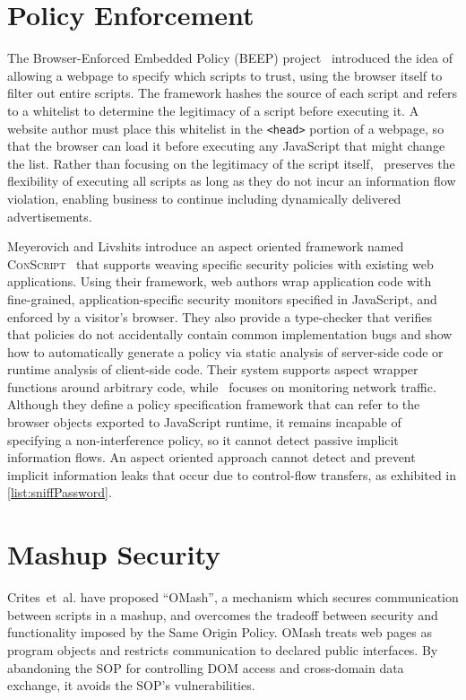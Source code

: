 \section{Policy Enforcement}

The Browser-Enforced Embedded Policy (BEEP) project~\cite{beep} introduced the idea of allowing a webpage to specify which scripts to trust, using the browser itself to filter out entire scripts.
The framework hashes the source of each script and refers to a whitelist to determine the legitimacy of a script before executing it.
A website author must place this whitelist in the \texttt{<head>} portion of a webpage, so that the browser can load it before executing any JavaScript that might change the list.
Rather than focusing on the legitimacy of the script itself, \FlowCore\ preserves the flexibility of executing all scripts as long as they do not incur an information flow violation, enabling business to continue including dynamically delivered advertisements.

Meyerovich and Livshits introduce an aspect oriented framework named \textsc{ConScript}~\cite{meyerovich.livshits+10} that supports weaving specific security policies with existing web applications.
Using their framework, web authors wrap application code with fine-grained, application-specific security monitors specified in JavaScript, and enforced by a visitor's browser.
They also provide a type-checker that verifies that policies do not accidentally contain common implementation bugs and show how to automatically generate a policy via static analysis of server-side code or runtime analysis of client-side code.
Their system supports aspect wrapper functions around arbitrary code, while \FlowCore\ focuses on monitoring network traffic.
Although they define a policy specification framework that can refer to the browser objects exported to JavaScript runtime, it remains incapable of specifying a non-interference policy, so it cannot detect passive implicit information flows.
An aspect oriented approach cannot detect and prevent implicit information leaks that occur due to control-flow transfers, as exhibited in \autoref{list:sniffPassword}.

\section{Mashup Security}

Crites~et~al.\cite{crites.etal+08} have proposed ``OMash'', a mechanism which secures communication between scripts in a mashup, and overcomes the tradeoff between security and functionality imposed by the Same Origin Policy.
OMash treats web pages as program objects and restricts communication to declared public interfaces.
By abandoning the SOP for controlling DOM access and cross-domain data exchange, it avoids the SOP's vulnerabilities.

